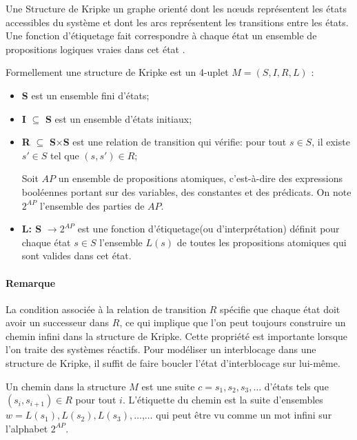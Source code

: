 \begin{definition}
Une Structure de Kripke un graphe orienté dont les nœuds représentent les états accessibles du système et dont les arcs représentent les transitions entre les états. Une fonction d'étiquetage fait correspondre à chaque état un ensemble de propositions logiques vraies dans cet état \citep{Kripke1963}.

Formellement une structure de Kripke est un 4-uplet ${\displaystyle M=(S,I,R,L)}$ \citep{Edmund1999}:
\begin{itemize}
	\item \textbf{S} est un ensemble fini d'états;
	\item \textbf{I} $\subseteq$ \textbf{S} est un ensemble d'états initiaux;
	\item \textbf{R} $\subseteq$ \textbf{S}$\times$\textbf{S}  est une relation de transition qui vérifie: pour tout ${\displaystyle s\in S}$, il existe ${\displaystyle s'\in S} $ tel que ${\displaystyle (s,s')\in R}$;
	
Soit ${\displaystyle AP}$ un ensemble de propositions atomiques, c'est-à-dire des expressions booléennes portant sur des variables, des constantes et des prédicats. On note ${\displaystyle 2^{AP}} $ l'ensemble des parties de ${\displaystyle AP}$.
	\item \textbf{L: S} $\rightarrow 2^{AP}$ est une fonction d'étiquetage(ou d'interprétation) définit pour chaque état ${\displaystyle s\in S}$ l'ensemble ${\displaystyle L(s)}$ de toutes les propositions atomiques qui sont valides dans cet état.
\end{itemize}

\paragraph{Remarque}
La condition associée à la relation de transition ${\displaystyle R}$ spécifie que chaque état doit avoir un successeur dans ${\displaystyle R}$, ce qui implique que l'on peut toujours construire un chemin infini dans la structure de Kripke. Cette propriété est importante lorsque l'on traite des systèmes réactifs\citep{Klaus2004}. Pour modéliser un interblocage dans une structure de Kripke, il suffit de faire boucler l'état d'interblocage sur lui-même.


Un chemin dans la structure ${\displaystyle M}$ est une suite ${\displaystyle c=s_{1},s_{2},s_{3},\ldots }$ d'états tels que ${\displaystyle (s_{i},s_{i+1})\in R}$ pour tout ${\displaystyle i}$. L'étiquette du chemin est la suite d'ensembles ${\displaystyle w=L(s_{1}),L(s_{2}),L(s_{3}),\ldots }$,$\ldots$ qui peut être vu comme un mot infini sur l'alphabet ${\displaystyle 2^{AP}}$.

\end{definition}


